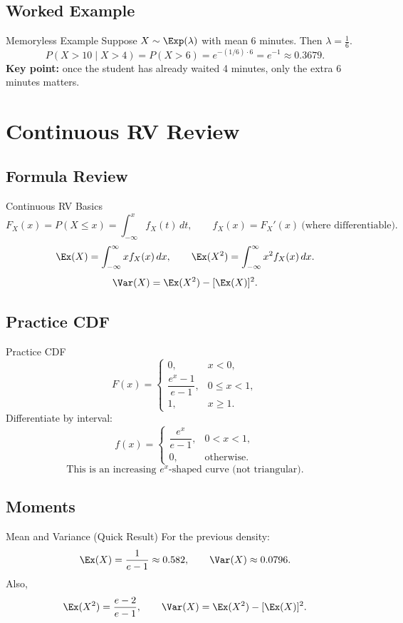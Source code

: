 \documentclass[aspectratio=169]{beamer}
\begin{document}
\subsection{Worked Example}
\begin{frame}{Memoryless Example}
  Suppose \(X\sim\Exp(\lambda)\) with mean \(6\) minutes. Then \(\lambda=\frac16\).
  \[
    P(X>10\mid X>4)=P(X>6)=e^{-(1/6)\cdot 6}=e^{-1}\approx 0.3679.
  \]
  \textbf{Key point:} once the student has already waited 4 minutes, only the extra 6 minutes matters.
\end{frame}

\section{Continuous RV Review}

\subsection{Formula Review}
\begin{frame}{Continuous RV Basics}
  \[
    F_X(x)=P(X\le x)=\int_{-\infty}^{x} f_X(t)\,dt,\qquad
    f_X(x)=F_X'(x)\ \text{(where differentiable)}.
  \]
  \[
    \Ex(X)=\int_{-\infty}^{\infty} x f_X(x)\,dx,\qquad
    \Ex(X^2)=\int_{-\infty}^{\infty} x^2 f_X(x)\,dx.
  \]
  \[
    \Var(X)=\Ex(X^2)-[\Ex(X)]^2.
  \]
\end{frame}

\subsection{Practice CDF}
\begin{frame}{Practice CDF}
  \[
  F(x)=
  \begin{cases}
    0, & x<0,\\
    \dfrac{e^x-1}{e-1}, & 0\le x<1,\\
    1, & x\ge 1.
  \end{cases}
  \]
  Differentiate by interval:
  \[
  f(x)=
  \begin{cases}
    \dfrac{e^x}{e-1}, & 0<x<1,\\
    0, & \text{otherwise}.
  \end{cases}
  \]
\[
  \text{This is an increasing }e^x\text{-shaped curve (not triangular).}
\]
\end{frame}

\subsection{Moments}
\begin{frame}{Mean and Variance (Quick Result)}
  For the previous density:
  \[
    \Ex(X)=\frac{1}{e-1}\approx 0.582,\qquad
    \Var(X)\approx 0.0796.
  \]
  Also,
  \[
    \Ex(X^2)=\frac{e-2}{e-1},\qquad
    \Var(X)=\Ex(X^2)-[\Ex(X)]^2.
  \]
  \vspace{2mm}
\end{frame}
\end{document}

